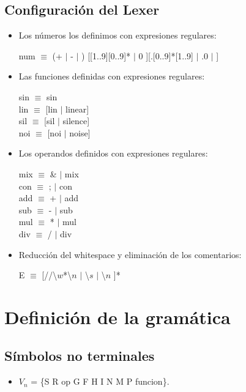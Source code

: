 \documentclass[a4paper]{article}
\begin{document}
\subsection{Configuración del Lexer }
\begin{itemize}

\item Los números los definimos con expresiones regulares:
\begin{center}
num $\equiv$ (+ $|$ - $|$ ) [[1..9][0..9]* $|$ 0 ][.[0..9]*[1..9] $|$ .0 $|$ ]
\end{center}

\item Las funciones definidas con expresiones regulares:
\begin{center}
sin $\equiv$ sin \\ 						
lin $\equiv$ [lin $|$ linear] \\
sil $\equiv$ [sil $|$ silence] \\
noi $\equiv$ [noi $|$ noise] \\
\end{center}

\item Los operandos definidos con expresiones regulares:
\begin{center}
mix $\equiv$ \& $|$ mix \\
con $\equiv$ ; $|$ con \\
add $\equiv$ + $|$ add \\
sub $\equiv$ - $|$ sub \\
mul $\equiv$ * $|$ mul \\
div $\equiv$ / $|$ div
\end{center}

\item Reducción del whitespace y eliminación de los comentarios:

\begin{center}
E $\equiv$ [//\textbackslash$w$*\textbackslash$n$ $|$ \textbackslash$s$ $|$ \textbackslash$n$ ]*  
\end{center}

\end{itemize}



\section{Definici\'on de la gram\'atica}

\subsection{Símbolos no terminales}
\begin{itemize}
\item \textbf{$V_n$} = \{S R op G F H I N M P funcion\}.
\end{itemize}
\end{document}
